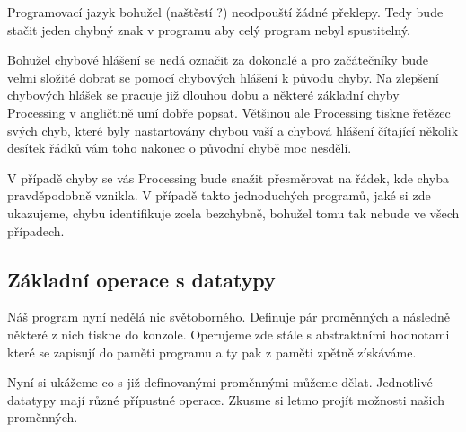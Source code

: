 \documentclass[11pt]{book}
\newcommand{\pododdil}[1]{\subsection{#1}\label{subsec:#1}}
\begin{document}
Programovací jazyk bohužel (naštěstí ?) neodpouští žádné překlepy. Tedy bude stačit jeden chybný znak v programu aby celý program nebyl spustitelný.

Bohužel chybové hlášení se nedá označit za dokonalé a pro začátečníky bude velmi složité dobrat se pomocí chybových hlášení k původu chyby. Na zlepšení chybových hlášek se pracuje již dlouhou dobu a některé základní chyby Processing v angličtině umí dobře popsat. Většinou ale Processing tiskne řetězec svých chyb, které byly nastartovány chybou vaší a chybová hlášení čítající několik desítek řádků vám toho nakonec o původní chybě moc nesdělí.

V případě chyby se vás Processing bude snažit přesměrovat na řádek, kde chyba pravděpodobně vznikla. V případě takto jednoduchých programů, jaké si zde ukazujeme, chybu identifikuje zcela bezchybně, bohužel tomu tak nebude ve všech případech.


\pododdil{Základní operace s datatypy}

Náš program nyní nedělá nic světoborného. Definuje pár proměnných a následně některé z nich tiskne do konzole. Operujeme zde stále s abstraktními hodnotami které se zapisují do paměti programu a ty pak z paměti zpětně získáváme.

Nyní si ukážeme co s již definovanými proměnnými můžeme dělat. Jednotlivé datatypy mají různé přípustné operace. Zkusme si letmo projít možnosti našich proměnných.
\end{document}
